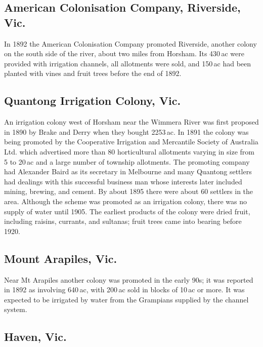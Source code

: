 \subsection*{American Colonisation Company, Riverside, Vic.}

In 1892 the American Colonisation Company promoted Riverside, another
colony on the south side of the river, about two miles from Horsham.
Its 430\,ac were provided with irrigation channels, all allotments
were sold, and 150\,ac had been planted with vines and fruit trees
before the end of 1892.

\subsection*{Quantong Irrigation Colony, Vic.}

An irrigation colony west of Horsham near the Wimmera River was first
proposed in 1890 by Brake and Derry when they bought 2253\,ac.  In
1891 the colony was being promoted by the Cooperative Irrigation and
Mercantile Society of Australia Ltd. which advertised more than 80
horticultural allotments varying in size from 5 to 20\,ac and a large
number of township allotments.  The promoting company had Alexander
Baird as its secretary in Melbourne and many Quantong settlers had
dealings with this successful business man whose interests later
included mining, brewing, and cement.  By about 1895 there were about
60 settlers in the area.  Although the scheme was promoted as an
irrigation colony, there was no supply of water until 1905.  The
earliest products of the colony were dried fruit, including raisins,
currants, and sultanas; fruit trees came into bearing before
1920.

\subsection*{Mount Arapiles, Vic.}

Near Mt Arapiles another colony was promoted in the early 90s; it was
reported in 1892 as involving 640\,ac, with 200\,ac sold in blocks of
10\,ac or more.  It was expected to be irrigated by water from the
Grampians supplied by the channel system.

\subsection*{Haven, Vic.}

